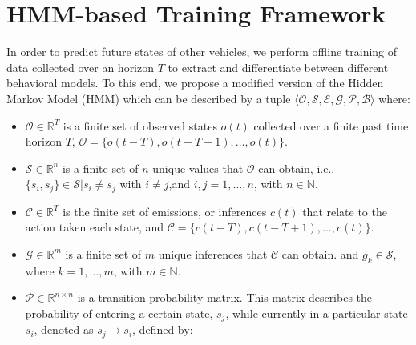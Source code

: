 \documentclass[letterpaper, 10 pt, conference]{ieeeconf}  %
\newcommand\NB[1]{$\spadesuit$\footnote{NB: #1}}
\begin{document}

\section{HMM-based Training Framework} \label{sec:fmwk}
 In order to predict future states of other vehicles, we perform offline training of data collected over an horizon $T$ to extract and differentiate between different behavioral models. To this end, we propose a modified version of the Hidden Markov Model (HMM) \cite{woohmm} which can be described by a tuple $\langle \mathcal{O},\mathcal{S},\mathcal{E},\mathcal{G},\mathcal{P},\mathcal{B} \rangle$  where:
\begin{itemize}
    \item $\mathcal{O}\in\mathbb{R}^T$ is a finite set of observed states $o(t)$ collected over a finite past time horizon $T$, $\mathcal{O} = \{ o(t-T), o(t-T+1), \ldots, o(t)\}$. 
    \item  $\mathcal{S}\in\mathbb{R}^n$ is a finite set of $n$ unique values that $\mathcal{O}$ can obtain, i.e., $\{s_i,s_j\} \in \mathcal{S} \vert s_i \neq s_j$ with $i\neq j$,and $i,j = 1,\ldots,n$, with $n \in \mathbb{N}$.
    \item $\mathcal{C}\in\mathbb{R}^T$ %
    is the finite set of emissions, or inferences $c(t)$ that relate to the action taken each state, and $\mathcal{C} = \{ c(t-T), c(t-T+1), \ldots, c(t)\}$. %
    \item $\mathcal{G}\in\mathbb{R}^m$ is a finite set of $m$ unique inferences that $\mathcal{C}$ can obtain. and $g_k \in \mathcal{S}$, where $k = 1,\ldots,m$, with $m \in \mathbb{N}$. 
    \item $\mathcal{P}\in\mathbb{R}^{n\times n}$ is a transition probability matrix. This matrix describes the probability of entering a certain state, $s_{j}$, while currently in a particular state $s_{i}$, denoted as $s_j \to s_i$, defined by:
        \begin{equation}

\end{equation}
\end{itemize}
\end{document}
